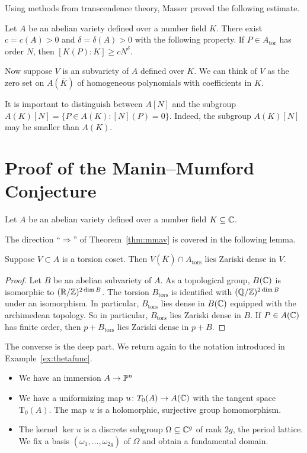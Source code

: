 Using methods from transcendence theory, Masser proved the following
estimate.

\begin{theorem}
  \label{thm:masser}
  Let $A$ be an abelian variety defined over a number field $K$. There
  exist $c=c(A)>0$ and $\delta=\delta(A)>0$ with the following
  property. If $P \in A_{\mathrm{tor}}$ has order $N$, then
  $[K(P):K]\ge c N^{\delta}$. 
\end{theorem}


Now suppose $V$ is an  subvariety of $A$ defined over $K$. We can
think of $V$ as the zero set on $A(\overline K)$ of homogeneous
polynomials with coefficients in $K$. 

It is important to distinguish between $A[N]$ and the subgroup
$A(K)[N] = \{P\in A(K) : [N](P)=0\}$. Indeed, the subgroup $A(K)[N]$ may be
smaller than $A(K)$.


\section{Proof of the Manin--Mumford Conjecture}

Let $A$ be an abelian variety defined over a number field
$K\subseteq{\mathbb{C}}$.

The direction ``$\Longrightarrow$'' of Theorem~\ref{thm:mmav} is covered in
the following lemma.

\begin{lemma}
  Suppose $V\subset A$ is a torsion coset. Then $V(\overline K)\cap
  A_{\mathrm{tors}}$ lies Zariski dense in $V$. 
\end{lemma}
\begin{proof}
  Let $B$ be an abelian subvariety of $A$. 
  As a topological group, $B({\mathbb{C}})$ is isomorphic to
  $({\mathbb{R}}/{\mathbb{Z}})^{2\dim B}$. The torsion $B_{\mathrm{tors}}$ is identified
  with $({\mathbb{Q}}/{\mathbb{Z}})^{2\dim B}$ under an isomorphism. In particular,
  $B_{\mathrm{tors}}$ lies dense in $B({\mathbb{C}})$ equipped with the
  archimedean topology. So in particular, $B_{\mathrm{tors}}$ lies
  Zariski dense in $B$. If $P\in A({\mathbb{C}})$ has finite order, then
  $p+B_{\mathrm{tors}}$ lies Zariski dense in $p+B$. 
\end{proof}

The converse is the deep part. 
We return again to
the notation introduced in Example~\ref{ex:thetafunc}.
\begin{itemize}
\item We have an immersion $A\rightarrow{\mathbb{P}}^n$
\item We have a uniformizing map $u\colon T_0(A)\rightarrow
  A({\mathbb{C}})$  with the tangent space
  $\mathrm{T}_0(A)$. The map $u$ is a holomorphic, surjective group
  homomorphism.
\item The kernel $\ker u$ is a discrete subgroup $\Omega\subseteq{\mathbb{C}}^g$
  of rank $2g$, the period lattice. We fix a basis $(\omega_1,\ldots,\omega_{2g})$ of
  $\Omega$ and obtain a fundamental domain.
\end{itemize}

